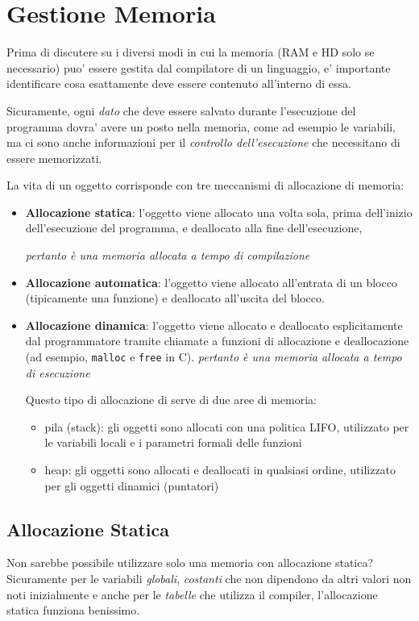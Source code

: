 % 

\chapter{Gestione Memoria}

Prima di discutere su i diversi modi in cui la memoria (RAM e HD solo se necessario) puo' essere gestita dal compilatore di un linguaggio, e' importante identificare cosa esattamente deve essere contenuto all'interno di essa. 

Sicuramente, ogni \textit{dato} che deve essere salvato durante l'esecuzione del programma dovra' avere un posto nella memoria, come ad esempio le variabili, ma ci sono anche informazioni per il \textit{controllo dell'esecuzione} che necessitano di essere memorizzati.

La vita di un oggetto corrisponde con tre meccanismi di allocazione di memoria:
\begin{itemize}
\item \textbf{Allocazione statica}: l'oggetto viene allocato una volta sola, prima dell'inizio dell'esecuzione del programma, e deallocato alla fine dell'esecuzione, 

\textit{pertanto è una memoria allocata a tempo di compilazione}
\item \textbf{Allocazione automatica}: l'oggetto viene allocato all'entrata di un blocco (tipicamente una funzione) e deallocato all'uscita del blocco.


\item \textbf{Allocazione dinamica}: l'oggetto viene allocato e deallocato esplicitamente dal programmatore tramite chiamate a funzioni di allocazione e deallocazione (ad esempio, \texttt{malloc} e \texttt{free} in C).
\textit{pertanto è una memoria allocata a tempo di esecuzione}

Questo tipo di allocazione di serve di due aree di memoria:
\begin{itemize}
  \item pila (stack): gli oggetti sono allocati con una politica LIFO, utilizzato per le variabili locali e i parametri formali delle funzioni
  \item heap: gli oggetti sono allocati e deallocati in qualsiasi ordine, utilizzato per gli oggetti dinamici (puntatori)
  \end{itemize}
\end{itemize}

\section{Allocazione Statica}
Non sarebbe possibile utilizzare solo una memoria con allocazione statica? Sicuramente per le variabili \textit{globali}, \textit{costanti} che non dipendono da altri valori non noti inizialmente e anche per le \textit{tabelle} che utilizza il compiler, l'allocazione statica funziona benissimo. 

